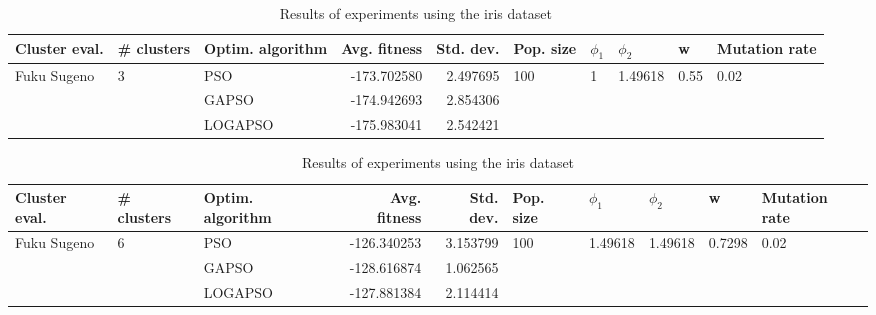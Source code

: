 \documentclass{article}
\begin{document}
\begin{table}
\centering
\caption{Results of experiments using the iris dataset}
\begin{tabular}{lllrrlllll}
\toprule
               Cluster eval. &        \# clusters & Optim. algorithm &  Avg. fitness &  Std. dev. &            Pop. size &         $\phi_{1}$ &               $\phi_{2}$ &                     w &         Mutation rate \\
\midrule
\multirow{3}{*}{Fuku Sugeno} & \multirow{3}{*}{3} &              PSO &   -173.702580 &   2.497695 & \multirow{3}{*}{100} & \multirow{3}{*}{1} & \multirow{3}{*}{1.49618} & \multirow{3}{*}{0.55} & \multirow{3}{*}{0.02} \\
                             &                    &            GAPSO &   -174.942693 &   2.854306 &                      &                    &                          &                       &                       \\
                             &                    &          LOGAPSO &   -175.983041 &   2.542421 &                      &                    &                          &                       &                       \\
\bottomrule
\end{tabular}
\end{table}
\begin{table}
\centering
\caption{Results of experiments using the iris dataset}
\begin{tabular}{lllrrlllll}
\toprule
               Cluster eval. &        \# clusters & Optim. algorithm &  Avg. fitness &  Std. dev. &            Pop. size &               $\phi_{1}$ &               $\phi_{2}$ &                       w &         Mutation rate \\
\midrule
\multirow{3}{*}{Fuku Sugeno} & \multirow{3}{*}{6} &              PSO &   -126.340253 &   3.153799 & \multirow{3}{*}{100} & \multirow{3}{*}{1.49618} & \multirow{3}{*}{1.49618} & \multirow{3}{*}{0.7298} & \multirow{3}{*}{0.02} \\
                             &                    &            GAPSO &   -128.616874 &   1.062565 &                      &                          &                          &                         &                       \\
                             &                    &          LOGAPSO &   -127.881384 &   2.114414 &                      &                          &                          &                         &                       \\
\bottomrule
\end{tabular}
\end{table}
\end{document}
